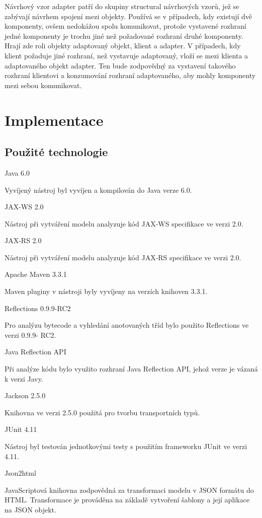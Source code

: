 \documentclass[11pt,twoside,a4paper]{book}
\begin{document}
Návrhový vzor adapter patří do skupiny structural návrhových vzorů, jež se 
zabývají návrhem spojení mezi objekty. Používá se v případech, kdy existují 
dvě komponenty, ovšem nedokážou spolu komunikovat, protože vystavené rozhraní 
jedné komponenty je trochu jiné než požadované rozhraní druhé komponenty. Hrají 
zde roli objekty adaptovaný objekt, klient a adapter. V případech, kdy klient 
požaduje jiné rozhraní, než vystavuje adaptovaný, vloží se mezi klienta a 
adaptovaného objekt adapter. Ten bude zodpovědný za vystavení takového rozhraní 
klientovi a konzumování rozhraní adaptovaného, aby mohly komponenty mezi sebou 
komunikovat.

\chapter{Implementace}

\section{Použité technologie}

Java 6.0

Vyvíjený nástroj byl vyvíjen a kompilován do Java verze 6.0.

JAX-WS 2.0

Nástroj při vytváření modelu analyzuje kód JAX-WS specifikace ve verzi 2.0.

JAX-RS 2.0

Nástroj při vytváření modelu analyzuje kód JAX-RS specifikace ve verzi 2.0.

Apache Maven 3.3.1

Maven pluginy v nástroji byly vyvíjeny na verzích knihoven 3.3.1.

Reflections 0.9.9-RC2

Pro analýzu bytecode a vyhledání anotovaných tříd bylo použito Reflections ve verzi 0.9.9-
RC2.

Java Reflection API

Při analýze kódu bylo využito rozhraní Java Reflection API, jehož verze je vázaná k verzi
Javy.

Jackson 2.5.0

Knihovna ve verzi 2.5.0 použitá pro tvorbu transportních typů.

JUnit 4.11

Nástroj byl testován jednotkovými testy s použitím frameworku JUnit ve verzi 4.11.

Json2html

JavaScriptová knihovna zodpovědná za transformaci modelu v JSON formátu do HTML.
Transformace je prováděna na základě vytvoření šablony a její aplikace na JSON objekt.
\end{document}
